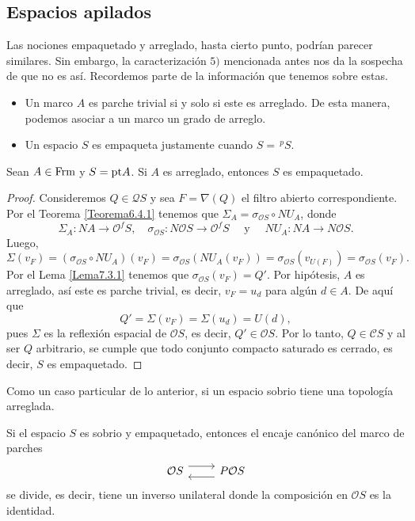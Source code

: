 \subsection{Espacios apilados}

Las nociones empaquetado y arreglado, hasta cierto punto, podrían parecer similares. Sin embargo, la caracterización $5)$ mencionada antes nos da la sospecha de que no es así. Recordemos parte de la información que tenemos sobre estas.

\begin{itemize}
    \item Un marco $A$ es parche trivial si y solo si este es arreglado. De esta manera, podemos asociar a un marco un grado de arreglo.

    \item Un espacio $S$ es empaqueta justamente cuando $S=\,^pS$.
\end{itemize}

\begin{lem}\label{Lema8.5.1}
    Sean $A\in \mathrm{Frm}$ y $S=\mathrm{pt} A$. Si $A$ es arreglado, entonces $S$ es empaquetado.
\end{lem}

\begin{proof}
    Consideremos $Q\in\mathcal{Q}S$ y sea $F=\nabla(Q)$ el filtro abierto correspondiente. Por el Teorema \ref{Teorema6.4.1} tenemos que $\Sigma_A=\sigma_{\mathcal{O}S}\circ NU_A$, donde 
    \[
    \Sigma_A\colon NA\to \mathcal{O}^fS,\quad\sigma_{\mathcal{O}S}\colon N\mathcal{O}S\to \mathcal{O}^fS\quad\mbox{ y }\quad NU_A\colon NA\to N\mathcal{O}S.
    \]
    Luego,
    \[
    \Sigma(v_F)=(\sigma_{\mathcal{O}S}\circ NU_A)(v_F)=\sigma_{\mathcal{O}S}(NU_A(v_F))=\sigma_{\mathcal{O}S}(v_{U(F)})=\sigma_{\mathcal{O}S}(v_F).
    \]
    Por el Lema \ref{Lema7.3.1} tenemos que $\sigma_{\mathcal{O}S}(v_F)=Q'$. Por hipótesis, $A$ es arreglado, así este es parche trivial, es decir, $v_F=u_d$ para algún $d\in A$. De aquí que
    \[
    Q'=\Sigma(v_F)=\Sigma(u_d)=U(d),
    \]
    pues $\Sigma$ es la reflexión espacial de $\mathcal{O}S$, es decir, $Q'\in \mathcal{O}S$. Por lo tanto, $Q\in \mathcal{C}S$ y al ser $Q$ arbitrario, se cumple que todo conjunto compacto saturado es cerrado, es decir, $S$ es empaquetado.
\end{proof}

Como un caso particular de lo anterior, si un espacio sobrio tiene una topología arreglada.

\begin{lem}\label{Lema8.5.2}
    Si el espacio $S$ es sobrio y empaquetado, entonces el encaje canónico del marco de parches
    \[\begin{tikzcd}
	{\mathcal{O}S} & {P\mathcal{O}S}
	\arrow[shift left=2, from=1-1, to=1-2]
	\arrow[shift left=2, from=1-2, to=1-1]
\end{tikzcd}\]
se divide, es decir, tiene un inverso unilateral donde la composición en $\mathcal{O}S$ es la identidad.
\end{lem}

